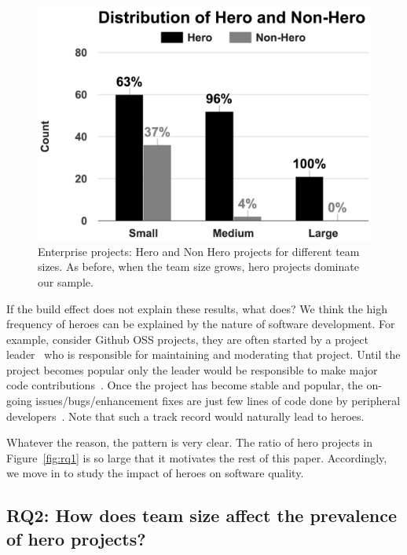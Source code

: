 \documentclass[sigconf]{acmart}
\theoremstyle{break}
\begin{document}
 \begin{figure}[!t]
  \centering
\includegraphics[width=.5\linewidth]{./fig/rq2b.png}
  \caption{Enterprise projects:  Hero and Non Hero projects for different team sizes. As before,
  when the
  team size grows,    hero projects dominate our sample.}
  \label{fig:rq2b}
\end{figure}

If the build effect does not explain these results, what does?
We think the  high frequency of heroes can be explained by the nature of software
development. For example, consider Github OSS projects,
they are often started by a project leader~\cite{ye2003toward} who is  responsible for maintaining and moderating that  project. 
Until the project becomes popular only the leader would be responsible to make major code contributions~\cite{tsay2014influence}. Once the project has become stable and popular, the on-going  issues/bugs/enhancement fixes are just few lines of code done by peripheral developers~\cite{pinto2016more}. Note that such a track record would naturally lead to heroes. 

 
%
%

Whatever the reason, the pattern is very clear.
The ratio of hero projects in Figure~\ref{fig:rq1} is so large that it
motivates the rest of this paper. Accordingly, we move in to study the impact
of heroes on software quality.



\subsection{RQ2: How does team size affect the prevalence of hero projects?}
\end{document}
